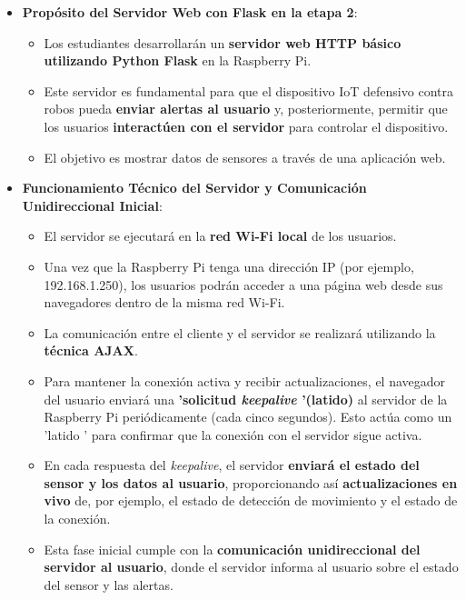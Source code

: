 \documentclass{report}
\begin{document}
\begin{itemize}
    \item \textbf{Propósito del Servidor Web con Flask en la etapa 2}:
    \begin{itemize}
        \item Los estudiantes desarrollarán un \textbf{servidor web HTTP básico utilizando Python Flask} en la Raspberry Pi.
        \item Este servidor es fundamental para que el dispositivo IoT defensivo contra robos pueda \textbf{enviar alertas al usuario} y, posteriormente, 
        permitir que los usuarios \textbf{interactúen con el servidor} para controlar el dispositivo.
        \item El objetivo es mostrar datos de sensores a través de una aplicación web.
    \end{itemize}

    \item \textbf{Funcionamiento Técnico del Servidor y Comunicación Unidireccional Inicial}:
    \begin{itemize}
        \item El servidor se ejecutará en la \textbf{red Wi-Fi local} de los usuarios.
        \item Una vez que la Raspberry Pi tenga una dirección IP (por ejemplo, 192.168.1.250), los usuarios podrán acceder a una página web desde sus 
        navegadores dentro de la misma red Wi-Fi.
        \item La comunicación entre el cliente y el servidor se realizará utilizando la \textbf{técnica AJAX}.
        \item Para mantener la conexión activa y recibir actualizaciones, el navegador del usuario enviará una \textbf{ 'solicitud \textit{keepalive} 
        '(latido)} al servidor de la Raspberry Pi periódicamente (cada cinco segundos). Esto actúa como un  'latido ' para confirmar que la conexión con 
        el servidor sigue activa.
        \item En cada respuesta del \textit{keepalive}, el servidor \textbf{enviará el estado del sensor y los datos al usuario}, proporcionando así 
        \textbf{actualizaciones en vivo} de, por ejemplo, el estado de detección de movimiento y el estado de la conexión.
        \item Esta fase inicial cumple con la \textbf{comunicación unidireccional del servidor al usuario}, donde el servidor informa al usuario sobre 
        el estado del sensor y las alertas.
    \end{itemize}


\end{itemize}
\end{document}
